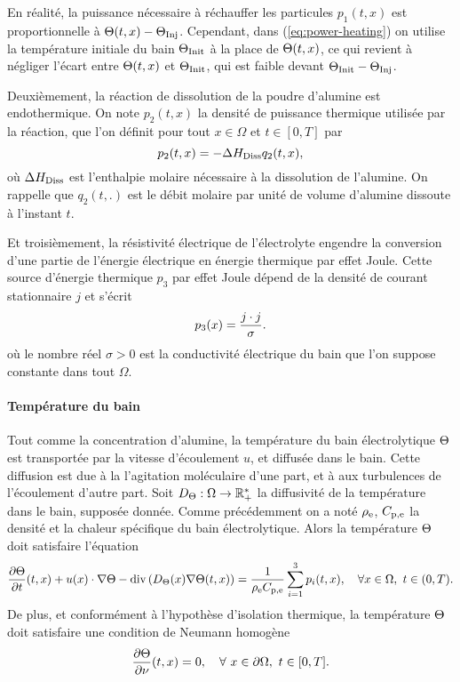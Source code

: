 \begin{remarque}
  En réalité, la puissance nécessaire à réchauffer les particules
  $p_1(t, x)$ est proportionnelle à ${\Theta(t, x) -
    \Theta_\text{Inj}}$. Cependant, dans (\ref{eq:power-heating}) on utilise la
  température initiale du bain $\Theta_\text{Init}$ à la place de
  $\Theta(t, x)$, ce qui revient à négliger l'écart entre
  $\Theta(t, x)$ et $\Theta_\text{Init}$, qui est faible devant ${\Theta_\text{Init} -
  \Theta_\text{Inj}}$.
\end{remarque}

Deuxièmement, la réaction de dissolution de la poudre d'alumine est
endothermique. On note $p_2(t, x)$ la densité de puissance thermique
utilisée par la réaction, que l'on définit pour tout $x\in\Omega$ et
$t\in[0, T]$ par
\begin{equation}\label{eq:p2}
p_2(t, x) = - \Delta H_\text{Diss} q_2(t, x),
\end{equation}
où $\Delta H_\text{Diss}$ est l'enthalpie molaire nécessaire à
la dissolution de l'alumine. On rappelle que $q_2(t, .)$ est le
débit molaire par unité de volume d'alumine dissoute à l'instant $t$.

Et troisièmement, la résistivité électrique de l'électrolyte engendre
la conversion d'une partie de l'énergie électrique en énergie
thermique par effet Joule. Cette source d'énergie thermique $p_3$ par
effet Joule dépend de la densité de courant stationnaire $j$ et
s'écrit
\begin{equation}\label{eq:p3}
p_3(x) = \frac{j\cdot j}{\sigma}.
\end{equation}
où le nombre réel $\sigma > 0$ est la conductivité électrique du bain que l'on
suppose constante dans tout $\Omega$.

\paragraph{Température du bain}
Tout comme la concentration d'alumine, la température du bain
électrolytique $\Theta$ est transportée par la vitesse
d'écoulement $u$, et diffusée dans le bain. Cette diffusion est due à
la l'agitation moléculaire d'une part, et à aux turbulences de
l'écoulement d'autre part. Soit $D_\Theta:\Omega\to\mathbb
R^*_+$ la diffusivité de la température dans le bain, supposée
donnée. Comme précédemment on a noté $\rho_\mathrm{e}$,
$C_{\mathrm{p,e}}$ la densité et la chaleur spécifique du bain
électrolytique. Alors la température $\Theta$ doit satisfaire
l'équation
\begin{equation}\label{eq:temperature}
\frac{\partial \Theta}{\partial t}(t, x) +
u(x)\cdot\nabla\Theta - \mathrm{div}\left( D_\Theta(x)\nabla
\Theta(t, x) \right) =
\frac{1}{\rho_\mathrm{e}C_{\mathrm{p,e}}}\sum_{i = 1}^{3}p_i(t, x),
\quad \forall x\in\Omega,\ t\in(0, T).
\end{equation}
De plus, et conformément à l'hypothèse d'isolation thermique, la température
$\Theta$ doit satisfaire une condition de Neumann homogène
\begin{equation}\label{eq:t-bc}
  \frac{\partial \Theta}{\partial \nu}(t, x) = 0, \quad
  \forall\ x\in\partial \Omega,\ t\in[0, T].
\end{equation}

